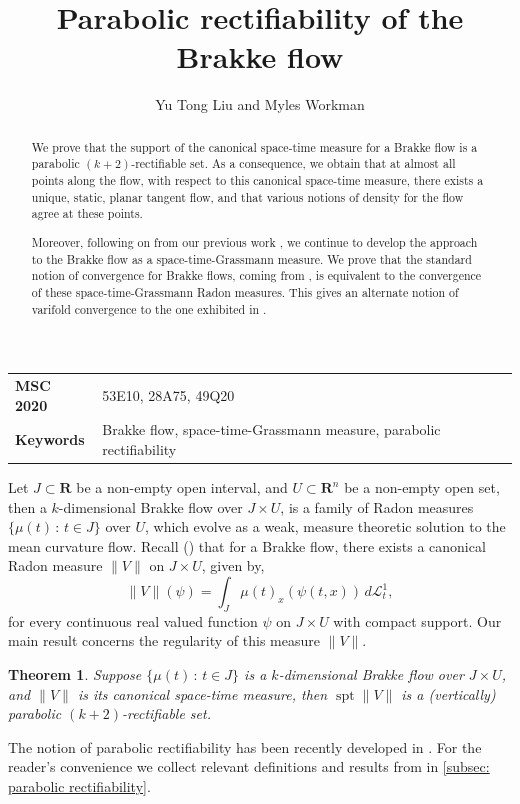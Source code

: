 \documentclass{article}
\author{Yu Tong Liu and Myles Workman}
\title{Parabolic rectifiability of the Brakke flow}
\date{}
\theoremstyle{plain}
\theoremstyle{definition}
\theoremstyle{plain}
\theoremstyle{remark}
\theoremstyle{remark}
\theoremstyle{plain}
\newtheorem{introTheorem}{Theorem}
\DeclareMathOperator{\spt}{spt}
\begin{document}
\maketitle

\begin{abstract}
    We prove that the support of the canonical space-time measure for a Brakke flow is a parabolic $(k+2)$-rectifiable set. 
    As a consequence, we obtain that at almost all points along the flow, with respect to this canonical space-time measure, there exists a unique, static, planar tangent flow, and that various notions of density for the flow agree at these points. 

    Moreover, following on from our previous work \cite{LW-Space-Time-GrassmannMeasureBrakkeFlow}, we continue to develop the approach to the Brakke flow as a space-time-Grassmann measure. 
    We prove that the standard notion of convergence for Brakke flows, coming from \cite[7.1]{Ilmanen-EllipticRegularization}, is equivalent to the convergence of these space-time-Grassmann Radon measures.
    This gives an alternate notion of varifold convergence to the one exhibited in \cite[7.1(ii)]{Ilmanen-EllipticRegularization}.
\end{abstract}

\begin{tabular}{ l p{9cm} }
    \textbf{MSC 2020} & 53E10, 28A75, 49Q20 \\
    \textbf{Keywords} & Brakke flow, space-time-Grassmann measure, parabolic rectifiability
\end{tabular}

\bigskip

Let $J \subset\mathbf{R}$ be a non-empty open interval, and $U \subset \mathbf{R}^{n}$ be a non-empty open set, then a $k$-dimensional Brakke flow over $J \times U$, is a family of Radon measures $\{ \mu (t) \, \colon \, t \in J \}$ over $U$, which evolve as a weak, measure theoretic solution to the mean curvature flow. 
Recall (\cite{LW-Space-Time-GrassmannMeasureBrakkeFlow}) that for a Brakke flow, there exists a canonical Radon measure $\| V \|$ on $J \times U$, given by, 
\begin{equation*}
    \textstyle \| V \| (\psi) = \int_{J} \mu (t)_{x} (\psi (t, x)) \, d \mathscr{L}^{1}_{t},
\end{equation*}
for every continuous real valued function $\psi$ on $J \times U$ with compact support.
Our main result concerns the regularity of this measure $\| V \|$.
\begin{introTheorem}\label{introthm: parabolic rectifiability}
    Suppose $\{ \mu (t) \, \colon \, t \in J \}$ is a $k$-dimensional Brakke flow over $J \times U$, and $\| V \|$ is its canonical space-time measure, then $\spt  \| V \|$ is a (vertically) parabolic $(k + 2)$-rectifiable set.
\end{introTheorem}
The notion of parabolic rectifiability has been recently developed in \cite{mattila2021parabolicrectifiabilitytangentplanes}. 
For the reader's convenience we collect relevant definitions and results from \cite{mattila2021parabolicrectifiabilitytangentplanes} in \ref{subsec: parabolic rectifiability}.
\end{document}
